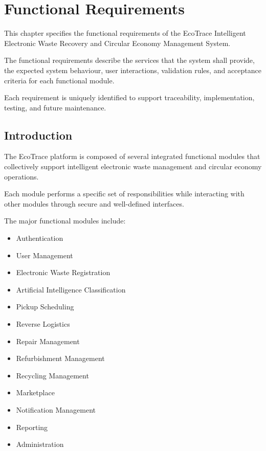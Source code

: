\chapter{Functional Requirements}
\label{chap:functional-requirements}

This chapter specifies the functional requirements of the EcoTrace
Intelligent Electronic Waste Recovery and Circular Economy Management
System.

The functional requirements describe the services that the system shall
provide, the expected system behaviour, user interactions, validation
rules, and acceptance criteria for each functional module.

Each requirement is uniquely identified to support traceability,
implementation, testing, and future maintenance.

\section{Introduction}
\label{sec:functional-introduction}

The EcoTrace platform is composed of several integrated functional
modules that collectively support intelligent electronic waste
management and circular economy operations.

Each module performs a specific set of responsibilities while
interacting with other modules through secure and well-defined
interfaces.

The major functional modules include:

\begin{itemize}

\item Authentication

\item User Management

\item Electronic Waste Registration

\item Artificial Intelligence Classification

\item Pickup Scheduling

\item Reverse Logistics

\item Repair Management

\item Refurbishment Management

\item Recycling Management

\item Marketplace

\item Notification Management

\item Reporting

\item Administration

\end{itemize}

